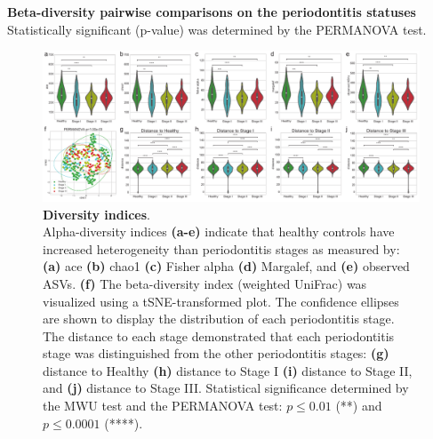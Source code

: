 \documentclass[11pt, a4paper, onecolumn, oneside]{report}
\begin{document}
            \begin{table}[p]
                \centering
                \caption[Beta-diversity pairwise comparisons on the periodontitis statuses]{\textbf{Beta-diversity pairwise comparisons on the periodontitis statuses} \\
                    Statistically significant (p-value) was determined by the PERMANOVA test.}
                \label{tab:Periodontitis-beta}
                
            \end{table}
            \clearpage

            \begin{figure}[p]
                \centering
                \includegraphics[width=\linewidth]{Figures/Periodontitis/Figure_1.pdf}
                \caption[Diversity indices]{\textbf{Diversity indices}. \\
                    Alpha-diversity indices \textbf{(a-e)} indicate that healthy controls have increased heterogeneity than periodontitis stages as measured by: \textbf{(a)} ace \textbf{(b)} chao1 \textbf{(c)} Fisher alpha \textbf{(d)} Margalef, and \textbf{(e)} observed ASVs. \textbf{(f)} The beta-diversity index (weighted UniFrac) was visualized using a tSNE-transformed plot. The confidence ellipses are shown to display the distribution of each periodontitis stage. The distance to each stage demonstrated that each periodontitis stage was distinguished from the other periodontitis stages: \textbf{(g)} distance to Healthy \textbf{(h)} distance to Stage I \textbf{(i)} distance to Stage II, and \textbf{(j)} distance to Stage III. Statistical significance determined by the MWU test and the PERMANOVA test: $p \le 0.01$ (**) and $p \le 0.0001$ (****).}
                \label{fig:Periodontitis-diversity}
            \end{figure}
            \clearpage
\end{document}
